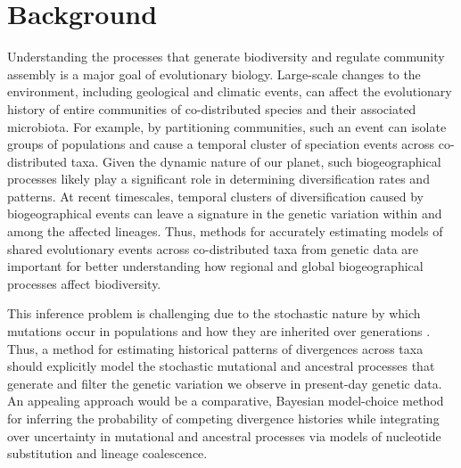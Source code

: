 \section{Background}

Understanding the processes that generate biodiversity and regulate
community assembly is a major goal of evolutionary biology.
Large-scale changes to the environment, including geological and climatic
events, can affect the evolutionary history of entire communities of
co-distributed species and their associated microbiota.
For example, by partitioning communities, such an event can isolate groups of
populations and cause a temporal cluster of speciation events across
co-distributed taxa.
Given the dynamic nature of our planet, such biogeographical processes likely
play a significant role in determining diversification rates and patterns.
At recent timescales, temporal clusters of diversification caused by
biogeographical events can leave a signature in the genetic variation within
and among the affected lineages.
Thus, methods for accurately estimating models of shared evolutionary events
across co-distributed taxa from genetic data are important for better
understanding how regional and global biogeographical processes affect
biodiversity.

This inference problem is challenging due to the stochastic nature by which
mutations occur in populations and how they are inherited over generations
\cite{Hudson1990,WakeleyCoalescent}.
Thus, a method for estimating historical patterns of divergences across taxa
should explicitly model the stochastic mutational and ancestral processes that
generate and filter the genetic variation we observe in present-day genetic
data.
An appealing approach would be a comparative, Bayesian model-choice method for
inferring the probability of competing divergence histories while integrating
over uncertainty in mutational and ancestral processes via models of nucleotide
substitution and lineage coalescence.

